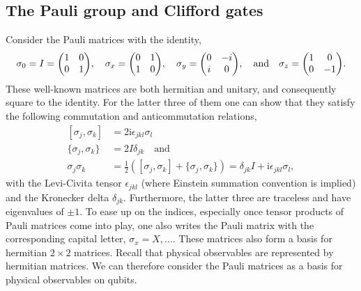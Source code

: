 \subsection{The Pauli group and Clifford gates}

Consider the Pauli matrices with the identity,
\begin{align}
  \sigma_0 = I = \mqty(\pmat{0}),\quad \sigma_x = \mqty(\pmat{1}), \quad \sigma_y =
  \mqty(\pmat{2}), \quad \text{and}\quad \sigma_z = \mqty(\pmat{3})
.\end{align}
These well-known matrices are both hermitian and unitary, and consequently
square to the identity. For the latter three of them one can show that they
satisfy the following commutation and anticommutation relations,
\begin{equation}\label{eq:pauli-comm}
 \begin{split}
  [\sigma_j, \sigma_k] &= 2\mathrm{i}\epsilon_{jkl}\sigma_l \\
  \{\sigma_j, \sigma_k\} &= 2I \delta_{jk}\quad \text{and} \\
  \sigma_j \sigma_k &= \frac{1}{2}\left([\sigma_j,\sigma_k] +
  \{\sigma_j,\sigma_k\}  \right) = \delta_{jk} I + \mathrm{i} \epsilon_{jkl}
  \sigma_l
,\end{split} 
\end{equation}
with the Levi-Civita tensor $\epsilon_{jkl}$ (where Einstein summation
convention is implied) and the Kronecker delta $\delta_{jk}$. Furthermore, the latter
three are traceless and have eigenvalues of $\pm 1$.
To ease up on the
indices, especially once tensor products of Pauli matrices come into play, one also writes the Pauli matrix with the corresponding capital
letter, $\sigma_x = X, \ldots$. These matrices also form a basis for hermitian
$2\times 2$ matrices. Recall that physical observables are represented by
hermitian matrices. We can therefore consider the Pauli matrices as a basis for
physical observables on qubits. 

